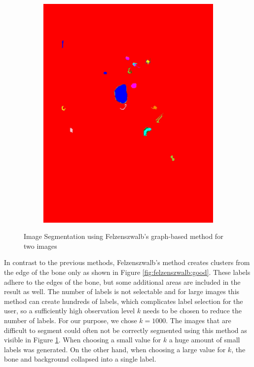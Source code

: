 \documentclass[pdftex,12pt,a4paper]{report}
\begin{document}
\begin{figure}[h]
\begin{subfigure}[b]{0.24\textwidth}
		\subcaption{}
		\label{fig:felzenszwalb:bad}
	\end{subfigure}
	\begin{subfigure}[b]{0.24\textwidth}
		\centering
		\includegraphics[width=.9\linewidth]{img/segmentation/bad/felzenszwalb/segmented.jpg}
		\subcaption*{}
		\label{}
	\end{subfigure}
	\caption{Image Segmentation using Felzenszwalb's graph-based method for two images}
	\label{fig:felzenszwalb}
\end{figure}

In contrast to the previous methods, Felzenszwalb's method creates clusters from the edge of the bone only as shown in Figure \ref{fig:felzenszwalb:good}. These labels adhere to the edges of the bone, but some additional areas are included in the result as well. The number of labels is not selectable and for large images this method can create hundreds of labels, which complicates label selection for the user, so a sufficiently high observation level $k$ needs to be chosen to reduce the number of labels. For our purpose, we chose $k=1000$. The images that are difficult to segment could often not be correctly segmented using this method as visible in Figure \ref{fig:felzenszwalb:bad}. When choosing a small value for $k$ a huge amount of small labels was generated. On the other hand, when choosing a large value for $k$, the bone and background collapsed into a single label.
\end{document}

